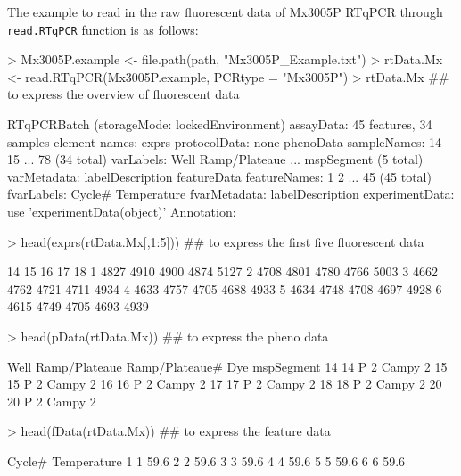 \documentclass[11pt]{article}
\newcommand{\code}[1]{{\tt #1}}
\begin{document}
The example to read in the raw fluorescent data of Mx3005P RTqPCR through \code{read.RTqPCR} function
is as follows:

\begin{Schunk}
\begin{Sinput}
> Mx3005P.example <- file.path(path, "Mx3005P_Example.txt") 
> rtData.Mx <- read.RTqPCR(Mx3005P.example, PCRtype = "Mx3005P")
> rtData.Mx ## to express the overview of fluorescent data
\end{Sinput}
\begin{Soutput}
RTqPCRBatch (storageMode: lockedEnvironment)
assayData: 45 features, 34 samples 
  element names: exprs 
protocolData: none
phenoData
  sampleNames: 14 15 ... 78 (34 total)
  varLabels: Well Ramp/Plateaue ... mspSegment (5 total)
  varMetadata: labelDescription
featureData
  featureNames: 1 2 ... 45 (45 total)
  fvarLabels: Cycle# Temperature
  fvarMetadata: labelDescription
experimentData: use 'experimentData(object)'
Annotation:  
\end{Soutput}
\begin{Sinput}
> head(exprs(rtData.Mx[,1:5])) ## to express the first five fluorescent data
\end{Sinput}
\begin{Soutput}
    14   15   16   17   18
1 4827 4910 4900 4874 5127
2 4708 4801 4780 4766 5003
3 4662 4762 4721 4711 4934
4 4633 4757 4705 4688 4933
5 4634 4748 4708 4697 4928
6 4615 4749 4705 4693 4939
\end{Soutput}
\begin{Sinput}
> head(pData(rtData.Mx)) ## to express the pheno data
\end{Sinput}
\begin{Soutput}
   Well Ramp/Plateaue Ramp/Plateaue#   Dye mspSegment
14   14             P              2 Campy          2
15   15             P              2 Campy          2
16   16             P              2 Campy          2
17   17             P              2 Campy          2
18   18             P              2 Campy          2
20   20             P              2 Campy          2
\end{Soutput}
\begin{Sinput}
> head(fData(rtData.Mx)) ## to express the feature data
\end{Sinput}
\begin{Soutput}
  Cycle# Temperature
1      1        59.6
2      2        59.6
3      3        59.6
4      4        59.6
5      5        59.6
6      6        59.6
\end{Soutput}
\end{Schunk}
\end{document}
